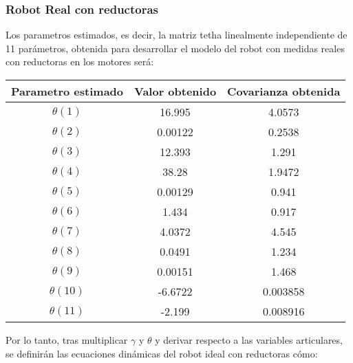 \subsubsection{Robot Real con reductoras}
Los parametros estimados, es decir, la matriz tetha linealmente independiente de 11 parámetros, obtenida para desarrollar el modelo del robot con medidas reales con reductoras en los motores será:
\begin{center}
	\begin{tabular}{| c | c | c |}

		\hline
		Parametro estimado & Valor obtenido & Covarianza obtenida \\
		\hline
		$\theta(1) $ & 16.995 & 4.0573 \\
		\hline
		$\theta(2) $ & 0.00122 & 0.2538 \\
		\hline
		$\theta(3) $ & 12.393 & 1.291 \\
		\hline
		$\theta(4) $ & 38.28 & 1.9472 \\
		\hline
		$\theta(5) $ & 0.00129 & 0.941 \\
		\hline
		$\theta(6) $ & 1.434 & 0.917 \\
		\hline
		$\theta(7) $ & 4.0372 & 4.545 \\
		\hline
		$\theta(8) $ & 0.0491 & 1.234 \\
		\hline
		$\theta(9) $ & 0.00151 & 1.468 \\
		\hline
		$\theta(10) $ & -6.6722 & 0.003858 \\
		\hline
		$\theta(11) $ & -2.199 & 0.008916 \\
		\hline
	\end{tabular}
\end{center}
Por lo tanto, tras multiplicar $\gamma$ y $\theta$ y derivar respecto a las variables articulares, se definirán las ecuaciones dinámicas del robot ideal con reductoras cómo:\\

